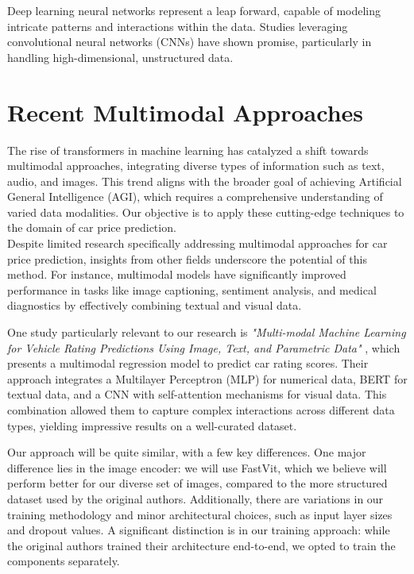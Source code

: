 Deep learning neural networks represent a leap forward, capable of modeling intricate patterns and interactions within the data. Studies leveraging convolutional neural networks (CNNs) have shown promise, particularly in handling high-dimensional, unstructured data.

\section{Recent Multimodal Approaches}
The rise of transformers in machine learning has catalyzed a shift towards multimodal approaches, integrating diverse types of information such as text, audio, and images. This trend aligns with the broader goal of achieving Artificial General Intelligence (AGI), which requires a comprehensive understanding of varied data modalities. Our objective is to apply these cutting-edge techniques to the domain of car price prediction.
\\

Despite limited research specifically addressing multimodal approaches for car price prediction, insights from other fields underscore the potential of this method. For instance, multimodal models have significantly improved performance in tasks like image captioning, sentiment analysis, and medical diagnostics by effectively combining textual and visual data.

One study particularly relevant to our research is \textit{"Multi-modal Machine Learning for Vehicle Rating Predictions Using Image, Text, and Parametric Data"} \cite{su2023multi}, which presents a multimodal regression model to predict car rating scores. Their approach integrates a Multilayer Perceptron (MLP) for numerical data, BERT for textual data, and a CNN with self-attention mechanisms for visual data. This combination allowed them to capture complex interactions across different data types, yielding impressive results on a well-curated dataset. 

Our approach will be quite similar, with a few key differences. One major difference lies in the image encoder: we will use FastVit, which we believe will perform better for our diverse set of images, compared to the more structured dataset used by the original authors. Additionally, there are variations in our training methodology and minor architectural choices, such as input layer sizes and dropout values. A significant distinction is in our training approach: while the original authors trained their architecture end-to-end, we opted to train the components separately.
